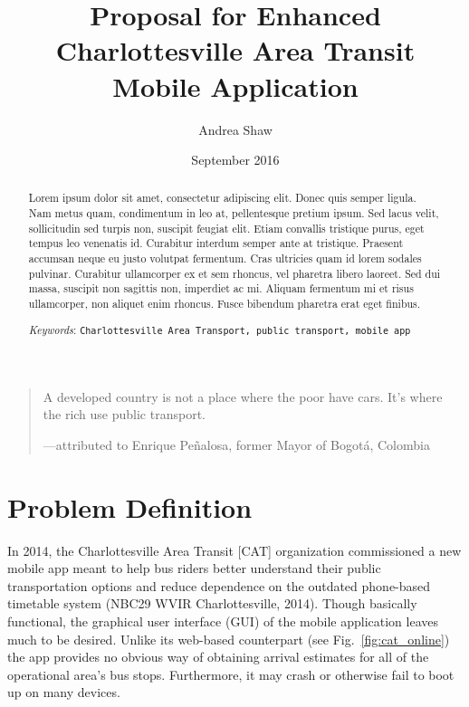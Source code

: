 \documentclass[12pt,letterpaper]{article}
\title{Proposal for Enhanced Charlottesville Area Transit Mobile Application}
\author{Andrea Shaw \\ \email{rcs8vq@virginia.edu}}%
\affil{Department of Computer Science \\ University of Virginia}
\date{September 2016}
\newcommand{\hl}[1] {%
{\color{red}#1}%
}
\begin{document}
\maketitle

\begin{abstract}
\hl{Lorem ipsum dolor sit amet, consectetur adipiscing elit. Donec quis semper
    ligula. Nam metus quam, condimentum in leo at, pellentesque pretium ipsum.
    Sed lacus velit, sollicitudin sed turpis non, suscipit feugiat elit. Etiam
    convallis tristique purus, eget tempus leo venenatis id. Curabitur interdum
    semper ante at tristique. Praesent accumsan neque eu justo volutpat
    fermentum. Cras ultricies quam id lorem sodales pulvinar. Curabitur
    ullamcorper ex et sem rhoncus, vel pharetra libero laoreet. Sed dui massa,
    suscipit non sagittis non, imperdiet ac mi. Aliquam fermentum mi et risus
    ullamcorper, non aliquet enim rhoncus. Fusce bibendum pharetra erat eget
    finibus.
}

\bigskip
    \noindent \emph{Keywords}: {\tt Charlottesville Area Transport, public transport, mobile app}
\end{abstract}

\vspace{5mm}

\begin{quote}
A developed country is not a place where the poor have cars. It's where the rich use public transport.

\raggedleft ---attributed to Enrique Pe\~{n}alosa, former Mayor of Bogot\'{a}, Colombia
\end{quote}

\section{Problem Definition}
In 2014, the Charlottesville Area Transit [CAT] organization commissioned a new
mobile app meant to help bus riders better understand their public
transportation options and reduce dependence on the outdated phone-based
timetable system (NBC29 WVIR Charlottesville, 2014). Though basically
functional, the graphical user interface (GUI) of the mobile application leaves
much to be desired. Unlike its web-based counterpart (see Fig.~\ref{fig:cat_online})
the app provides no obvious way of obtaining arrival estimates for all of the
operational area's
bus stops. Furthermore, it may crash or otherwise fail to boot up on many
devices.
\end{document}
